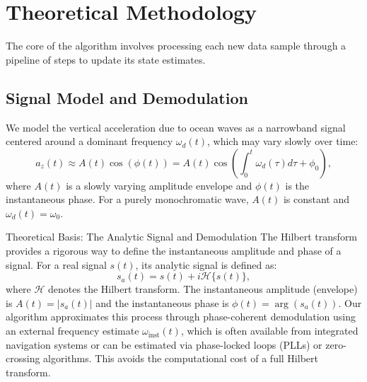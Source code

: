 \documentclass[11pt]{article}
\begin{document}
\section{Theoretical Methodology}
The core of the algorithm involves processing each new data sample through a pipeline of steps to update its state estimates.

\subsection{Signal Model and Demodulation}
We model the vertical acceleration due to ocean waves as a narrowband signal centered around a dominant frequency $\omega_d(t)$, which may vary slowly over time:
\begin{equation}
a_z(t) \approx A(t) \cos(\phi(t)) = A(t) \cos\left( \int_0^t \omega_d(\tau) d\tau + \phi_0 \right),
\end{equation}
where $A(t)$ is a slowly varying amplitude envelope and $\phi(t)$ is the instantaneous phase. For a purely monochromatic wave, $A(t)$ is constant and $\omega_d(t) = \omega_0$.

\begin{theorybox}{Theoretical Basis: The Analytic Signal and Demodulation}
The Hilbert transform provides a rigorous way to define the instantaneous amplitude and phase of a signal. For a real signal $s(t)$, its analytic signal is defined as:
\begin{equation}
s_a(t) = s(t) + i \mathcal{H}\{s(t)\},
\end{equation}
where $\mathcal{H}$ denotes the Hilbert transform. The instantaneous amplitude (envelope) is $A(t) = |s_a(t)|$ and the instantaneous phase is $\phi(t) = \arg(s_a(t))$. Our algorithm approximates this process through phase-coherent demodulation using an external frequency estimate $\omega_{\text{inst}}(t)$, which is often available from integrated navigation systems or can be estimated via phase-locked loops (PLLs) or zero-crossing algorithms. This avoids the computational cost of a full Hilbert transform.
\end{theorybox}
\end{document}
